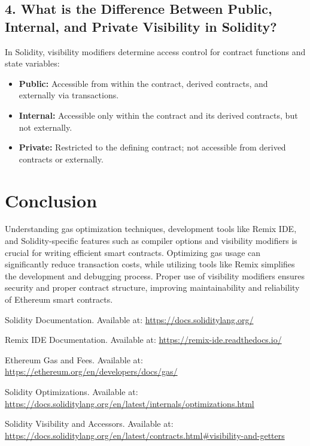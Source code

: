 \documentclass[11pt]{article}
\begin{document}
\subsection{4. What is the Difference Between Public, Internal, and Private Visibility in Solidity?}

In Solidity, visibility modifiers determine access control for contract functions and state variables:

\begin{itemize}
    \item \textbf{Public:} Accessible from within the contract, derived contracts, and externally via transactions.
    \item \textbf{Internal:} Accessible only within the contract and its derived contracts, but not externally.
    \item \textbf{Private:} Restricted to the defining contract; not accessible from derived contracts or externally.
\end{itemize}

\section{Conclusion}

Understanding gas optimization techniques, development tools like Remix IDE, and Solidity-specific features such as compiler options and visibility modifiers is crucial for writing efficient smart contracts. Optimizing gas usage can significantly reduce transaction costs, while utilizing tools like Remix simplifies the development and debugging process. Proper use of visibility modifiers ensures security and proper contract structure, improving maintainability and reliability of Ethereum smart contracts.





\clearpage
\begin{thebibliography}{99}
    Solidity Documentation. Available at: \url{https://docs.soliditylang.org/}

    Remix IDE Documentation. Available at: \url{https://remix-ide.readthedocs.io/}

    Ethereum Gas and Fees. Available at: \url{https://ethereum.org/en/developers/docs/gas/}

    Solidity Optimizations. Available at: \url{https://docs.soliditylang.org/en/latest/internals/optimizations.html}

    Solidity Visibility and Accessors. Available at: \url{https://docs.soliditylang.org/en/latest/contracts.html#visibility-and-getters}
\end{thebibliography}
\end{document}
